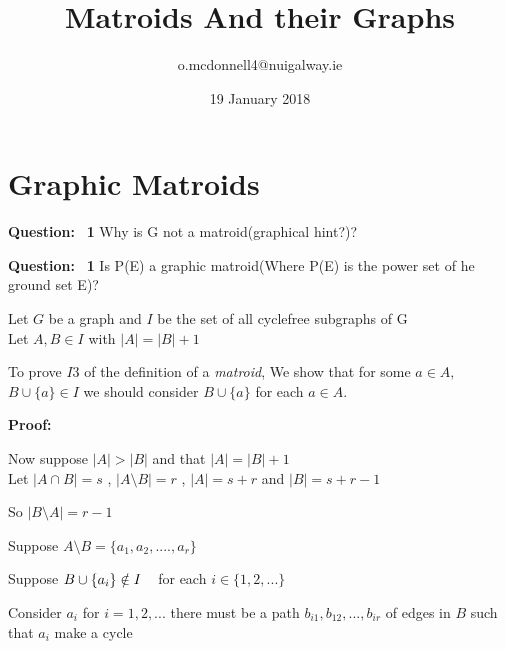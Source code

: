 \documentclass{article}
\title{Matroids And their Graphs}
\author{o.mcdonnell4@nuigalway.ie }
\date{19 January 2018}
\theoremstyle{plain}
\theoremstyle{definition}
\theoremstyle{remark}
\newcounter{Question}
\newcommand\Question{%
    \textbf{Question:}~%
    \setcounter{Question}{0}%
}
\newcommand\Proof{%
    \textbf{Proof:}~%
}
\begin{document}
\maketitle
 
 \section{Graphic Matroids}
 
 \noindent\Question \textbf{1}
 Why is G not a matroid(graphical hint?)?
 
 \vspace{2mm}
 
 \noindent\Question \textbf{1}
 Is P(E) a graphic matroid(Where P(E) is the power set of he ground set E)?
 
 \vspace{5mm}
 
 \noindent Let $G$ be a graph and $I$ be the set of all cyclefree subgraphs of G\\
 Let $ A ,B  \in  I $ with $ |A|  =  |B|  + 1 $
 
 \vspace{3mm}
 
 \noindent To prove $ I3 $ of the definition of a \textit{matroid}, We show that for some $ a \in A ,$\\$ B \cup \{a \} \in I $  we should consider $ B \cup \{a \} $ for each $ a \in A $. 
 
 \vspace{3mm}
 
 \noindent\Proof
 
 \noindent Now suppose $ |A|  >  |B| $ and that $|A|  =  |B| + 1$\\
 Let 
 $ |A \cap B| = s $ , $ |A \setminus B| = r$ ,
 $ |A| = s + r $ and $ |B| = s + r - 1$ 
 
\noindent So $ |B \setminus A| = r - 1$
 
 \vspace{3mm}
 
 \noindent Suppose $ A \setminus B = \{ a_1, a_2, .... , a_r \} $ 
 
 \noindent Suppose $ B \cup \{ a_i \} \notin I \hspace{3mm} $ for each $ i \in \{ 1,2,... \}$
 
 \vspace{2mm}
 
 \noindent Consider $ a_i $ for $ i = 1, 2,... $ there must be a path $ b_{i1}, b_{12}, ... , b_{ir} $ of edges in $B$ such that $ a_i $ make a cycle
  
\end{document}
